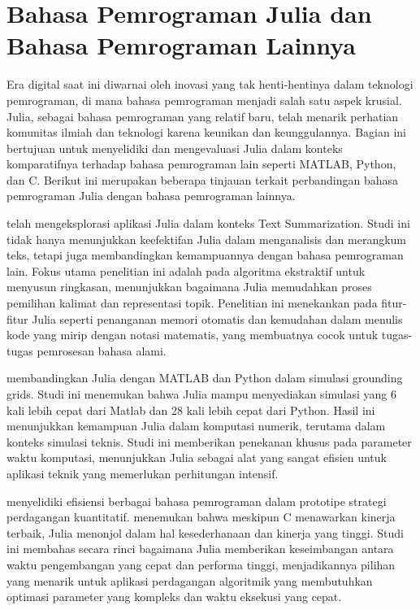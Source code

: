 

\section{Bahasa Pemrograman Julia dan Bahasa Pemrograman Lainnya}

Era digital saat ini diwarnai oleh inovasi yang tak henti-hentinya dalam
teknologi pemrograman, di mana bahasa pemrograman menjadi salah satu aspek krusial.
Julia, sebagai bahasa pemrograman yang relatif baru, telah menarik perhatian
komunitas ilmiah dan teknologi karena keunikan dan keunggulannya. Bagian ini bertujuan
untuk menyelidiki dan mengevaluasi Julia dalam konteks komparatifnya terhadap bahasa
pemrograman lain seperti MATLAB, Python, dan C. Berikut ini merupakan beberapa
tinjauan terkait perbandingan bahasa pemrograman Julia dengan bahasa pemrograman
lainnya.

\cite{thakurTextSummarizerUsing2022} telah mengeksplorasi aplikasi Julia dalam
konteks Text Summarization. Studi ini tidak hanya menunjukkan keefektifan Julia dalam
menganalisis dan merangkum teks, tetapi juga membandingkan kemampuannya dengan
bahasa pemrograman lain. Fokus utama penelitian ini adalah pada algoritma ekstraktif
untuk menyusun ringkasan, menunjukkan bagaimana Julia memudahkan proses
pemilihan kalimat dan representasi topik. Penelitian ini menekankan pada fitur-fitur
Julia seperti penanganan memori otomatis dan kemudahan dalam menulis kode yang mirip
dengan notasi matematis, yang membuatnya cocok untuk tugas-tugas pemrosesan
bahasa alami.

\cite{mouraUsageJuliaProgramming2019} membandingkan Julia dengan MATLAB dan
Python dalam simulasi grounding grids. Studi ini menemukan bahwa Julia mampu menyediakan
simulasi yang 6 kali lebih cepat dari Matlab dan 28 kali lebih cepat dari Python.
Hasil ini menunjukkan kemampuan Julia dalam komputasi numerik, terutama dalam konteks
simulasi teknis. Studi ini memberikan penekanan khusus pada parameter waktu
komputasi, menunjukkan Julia sebagai alat yang sangat efisien untuk aplikasi teknik
yang memerlukan perhitungan intensif.

\cite{cecconMomentumStrategiesComparison2016} menyelidiki efisiensi berbagai bahasa
pemrograman dalam prototipe strategi perdagangan kuantitatif.
\cite{cecconMomentumStrategiesComparison2016} menemukan bahwa meskipun C
menawarkan kinerja terbaik, Julia menonjol dalam hal kesederhanaan dan kinerja yang
tinggi. Studi ini membahas secara rinci bagaimana Julia memberikan keseimbangan
antara waktu pengembangan yang cepat dan performa tinggi, menjadikannya pilihan yang
menarik untuk aplikasi perdagangan algoritmik yang membutuhkan optimasi parameter
yang kompleks dan waktu eksekusi yang cepat.

